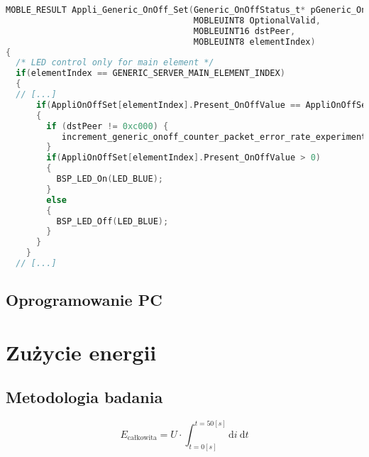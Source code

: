 \begin{lstlisting}[language=C,
    caption={Testowy kod C},
    label={lst:kod cpp}]
MOBLE_RESULT Appli_Generic_OnOff_Set(Generic_OnOffStatus_t* pGeneric_OnOffParam, 
                                     MOBLEUINT8 OptionalValid,
                                     MOBLEUINT16 dstPeer,
                                     MOBLEUINT8 elementIndex)
{
  /* LED control only for main element */
  if(elementIndex == GENERIC_SERVER_MAIN_ELEMENT_INDEX)
  {
  // [...]
      if(AppliOnOffSet[elementIndex].Present_OnOffValue == AppliOnOffSet[elementIndex].TargetValue)
      {
    	if (dstPeer != 0xc000) {
    	   increment_generic_onoff_counter_packet_error_rate_experiment(AppliOnOffSet[elementIndex].Present_OnOffValue, dstPeer);
    	}
        if(AppliOnOffSet[elementIndex].Present_OnOffValue > 0)
        {
          BSP_LED_On(LED_BLUE);
        }
        else
        {
          BSP_LED_Off(LED_BLUE);
        }
      }
    }  
  // [...]
\end{lstlisting}

\subsection{Oprogramowanie PC} \label{prep:pc-software}


\section{Zużycie energii}

\subsection{Metodologia badania}


\begin{equation} \label{energy_equation}
E_{\text{całkowita}} = U \cdot \int_{t=0[s]}^{t=50[s]} \mathrm{d}i \: \mathrm{d} t
\end{equation}

